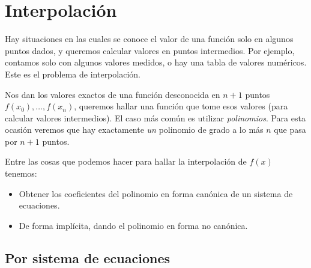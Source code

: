 

\chapter{Interpolación}
\label{cha:interpolacion}

  Hay situaciones en las cuales se conoce el valor de una función
  solo en algunos puntos dados,
  y queremos calcular valores en puntos intermedios.
  Por ejemplo,
  contamos solo con algunos valores medidos,
  o hay una tabla de valores numéricos.
  Este es el problema de interpolación.

  Nos dan los valores exactos de una función desconocida
  en \(n + 1\) puntos \(f(x_0), \ldots, f(x_n)\),
  queremos hallar una función que tome esos valores
  (para calcular valores intermedios).
  El caso más común es utilizar \emph{polinomios}.
  Para esta ocasión veremos
  que hay exactamente \emph{un} polinomio de grado a lo más \(n\)
  que pasa por \(n + 1\) puntos.

  Entre las cosas que podemos hacer
  para hallar la interpolación de \(f(x)\) tenemos:
  \begin{itemize}
  \item
    Obtener los coeficientes
    del polinomio en forma canónica de un sistema de ecuaciones.
  \item
    De forma implícita,
    dando el polinomio en forma no canónica.
  \end{itemize}

\section{Por sistema de ecuaciones}

